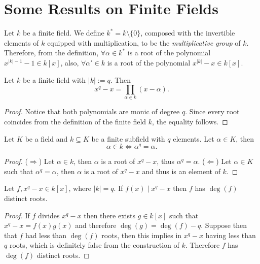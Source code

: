 \section{Some Results on Finite Fields}

\begin{definition}
   Let \(k\) be a finite field. We define \(k^\ast = k \setminus \{0\}\),
   composed with the invertible elements of \(k\) equipped with multiplication,
   to be the \emph{multiplicative group} of \(k\). Therefore, from the
   definition, \(\forall \alpha \in k^\ast\) is a root of the polynomial
   \(x^{|k|-1} - 1 \in k[x]\), also, \(\forall \alpha' \in k\) is a root of the
   polynomial \(x^{|k|} - x \in k[x]\).
\end{definition}

\begin{proposition}
   Let \(k\) be a finite field with \(|k| := q\). Then
   \[
      x^{q} - x = \prod_{\alpha \in k} (x-\alpha).
   \] 
\end{proposition}

\begin{proof}
   Notice that both polynomials are monic of degree \(q\). Since every root
   coincides from the definition of the finite field \(k\), the equality
   follows.
\end{proof}

\begin{corollary}
   Let \(K\) be a field and \(k \subseteq K\) be a finite subfield with \(q\)
   elements. Let \(\alpha \in K\), then 
   \[
      \alpha \in k \Leftrightarrow \alpha^q = \alpha.
   \] 
\end{corollary}

\begin{proof}
   (\(\Rightarrow\)) Let \(\alpha \in k\), then \(\alpha\) is a root of \(x^q -
   x\), thus \(\alpha^q = \alpha\). (\(\Leftarrow\)) Let \(\alpha \in K\) such
   that \(\alpha^q = \alpha\), then \(\alpha\) is a root of \(x^q - x\) and thus
   is an element of \(k\).
\end{proof}

\begin{corollary}
   Let \(f, x^q - x \in k[x]\), where \(|k| = q\). If \(f(x) \mid x^q - x\) then
   \(f\) has \(\deg(f)\) distinct roots.
\end{corollary}

\begin{proof}
   If \(f\) divides  \(x^q - x\) then there exists \(g \in k[x]\) such that
   \(x^q - x = f(x)g(x)\) and therefore \(\deg(g) = \deg(f) - q\). Suppose then
   that \(f\) had less than \(\deg(f)\) roots, then this implies in  \(x^q - x\)
   having less than \(q\) roots, which is definitely false from the
   construction of \(k\). Therefore \(f\) has \(\deg(f)\) distinct roots.
\end{proof}

